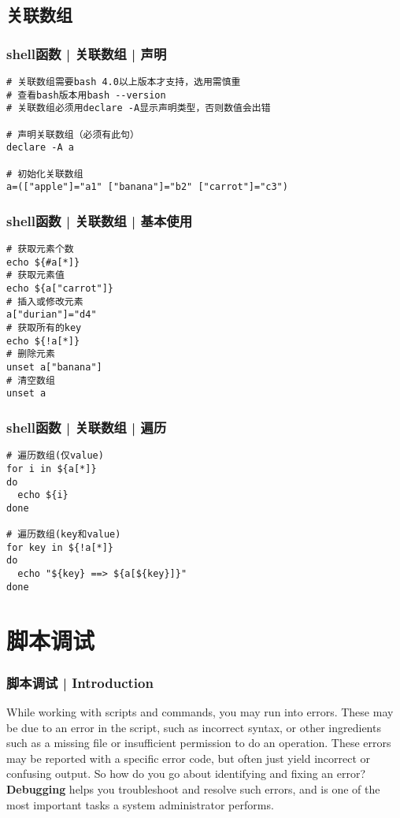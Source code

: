 \subsection{关联数组}
\begin{frame}[fragile]
  \frametitle{shell函数 | 关联数组 | 声明}
\begin{lstlisting}
# 关联数组需要bash 4.0以上版本才支持，选用需慎重
# 查看bash版本用bash --version
# 关联数组必须用declare -A显示声明类型，否则数值会出错

# 声明关联数组（必须有此句）
declare -A a

# 初始化关联数组
a=(["apple"]="a1" ["banana"]="b2" ["carrot"]="c3")
\end{lstlisting}
\end{frame}

\begin{frame}[fragile]
  \frametitle{shell函数 | 关联数组 | 基本使用}
\begin{lstlisting}
# 获取元素个数
echo ${#a[*]}
# 获取元素值
echo ${a["carrot"]}
# 插入或修改元素
a["durian"]="d4"
# 获取所有的key
echo ${!a[*]}
# 删除元素
unset a["banana"]
# 清空数组
unset a
\end{lstlisting}
\end{frame}

\begin{frame}[fragile]
  \frametitle{shell函数 | 关联数组 | 遍历}
\begin{lstlisting}
# 遍历数组(仅value)
for i in ${a[*]}
do
  echo ${i}
done

# 遍历数组(key和value)
for key in ${!a[*]}
do
  echo "${key} ==> ${a[${key}]}"
done
\end{lstlisting}
\end{frame}

\section{脚本调试}
\begin{frame}
  \frametitle{脚本调试 | Introduction}
  While working with scripts and commands, you may run into errors.  These may be due to an error in the script, such as incorrect syntax, or other ingredients such as a missing file or insufficient permission to do an operation. These errors may be reported with a specific error code, but often just yield incorrect or confusing output. So how do you go about identifying and fixing an error?\\
  \vspace{0.3cm}
  \textbf{Debugging} helps you troubleshoot and resolve such errors, and is one of the most important tasks a system administrator performs.
\end{frame}

